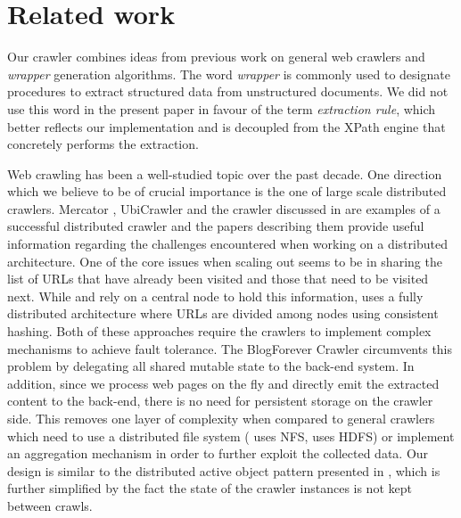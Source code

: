 \section{Related work}
\label{relatedwork}

Our crawler combines ideas from previous work on general web crawlers and \emph{wrapper} generation algorithms. The word \emph{wrapper} is commonly used to designate procedures to extract structured data from unstructured documents. We did not use this word in the present paper in favour of the term \emph{extraction rule}, which better reflects our implementation and is decoupled from the XPath engine that concretely performs the extraction.

Web crawling has been a well-studied topic over the past decade. One direction which we believe to be of crucial importance is the one of large scale distributed crawlers. Mercator \cite{heydon99mercator}, UbiCrawler \cite{boldi2003} and the crawler discussed in \cite{shkapenyuk2002} are examples of a successful distributed crawler and the papers describing them provide useful information regarding the challenges encountered when working on a distributed architecture. One of the core issues when scaling out seems to be in sharing the list of URLs that have already been visited and those that need to be visited next. While \cite{heydon99mercator} and \cite{shkapenyuk2002} rely on a central node to hold this information, \cite{boldi2003} uses a fully distributed architecture where URLs are divided among nodes using consistent hashing. Both of these approaches require the crawlers to implement complex mechanisms to achieve fault tolerance. The BlogForever Crawler circumvents this problem by delegating all shared mutable state to the back-end system. In addition, since we process web pages on the fly and directly emit the extracted content to the back-end, there is no need for persistent storage on the crawler side. This removes one layer of complexity when compared to general crawlers which need to use a distributed file system (\cite{shkapenyuk2002} uses NFS, \cite{berger2011} uses HDFS) or implement an aggregation mechanism in order to further exploit the collected data. Our design is similar to the distributed active object pattern presented in \cite{activeobject1996}, 
which is further simplified by the fact the state of the crawler instances is not kept between crawls. 

